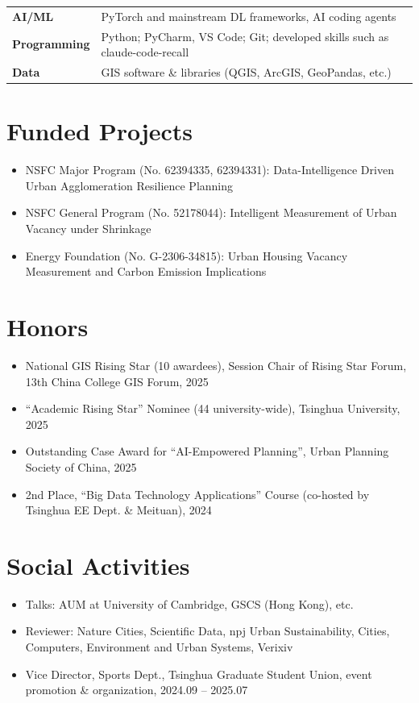 \documentclass[10pt,a4paper]{article}
\begin{document}
\begin{tabularx}{\textwidth}{@{}lX@{}}
\textbf{AI/ML} & PyTorch and mainstream DL frameworks, AI coding agents \\
\textbf{Programming} & Python; PyCharm, VS Code; Git; developed skills such as claude-code-recall\\
\textbf{Data} & GIS software \& libraries (QGIS, ArcGIS, GeoPandas, etc.) \\
\end{tabularx}

\section{Funded Projects}

\begin{itemize}[leftmargin=1.2em, itemsep=3pt, parsep=1pt, topsep=2pt]
  \item NSFC Major Program (No. 62394335, 62394331): Data-Intelligence Driven Urban Agglomeration Resilience Planning
  \item NSFC General Program (No. 52178044): Intelligent Measurement of Urban Vacancy under Shrinkage
  \item Energy Foundation (No. G-2306-34815): Urban Housing Vacancy Measurement and Carbon Emission Implications
\end{itemize}

\section{Honors}

\begin{itemize}[leftmargin=1.2em, itemsep=3pt, parsep=1pt, topsep=2pt]
  \item National GIS Rising Star (10 awardees), Session Chair of Rising Star Forum, 13th China College GIS Forum, 2025
  \item ``Academic Rising Star'' Nominee (44 university-wide), Tsinghua University, 2025
  \item Outstanding Case Award for ``AI-Empowered Planning'', Urban Planning Society of China, 2025
  \item 2nd Place, ``Big Data Technology Applications'' Course (co-hosted by Tsinghua EE Dept. \& Meituan), 2024
\end{itemize}

\section{Social Activities}

\begin{itemize}[leftmargin=1.2em, itemsep=3pt, parsep=1pt, topsep=2pt]
  \item Talks: AUM at University of Cambridge, GSCS (Hong Kong), etc.
  \item Reviewer: Nature Cities, Scientific Data, npj Urban Sustainability, Cities, Computers, Environment and Urban Systems, Verixiv
  \item Vice Director, Sports Dept., Tsinghua Graduate Student Union, event promotion \& organization, 2024.09 -- 2025.07
\end{itemize}
\end{document}
